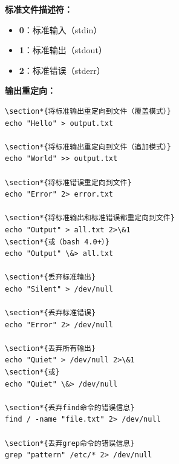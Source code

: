 \documentclass[12pt,UTF8]{ctexbook}
\begin{document}
\textbf{标准文件描述符：}
\begin{itemize}
    \item \textbf{0}：标准输入（stdin）
    \item \textbf{1}：标准输出（stdout）
    \item \textbf{2}：标准错误（stderr）
\end{itemize}

\textbf{输出重定向：}
\begin{verbatim}
\section*{将标准输出重定向到文件（覆盖模式）}
echo "Hello" > output.txt

\section*{将标准输出重定向到文件（追加模式）}
echo "World" >> output.txt

\section*{将标准错误重定向到文件}
echo "Error" 2> error.txt

\section*{将标准输出和标准错误都重定向到文件}
echo "Output" > all.txt 2>\&1
\section*{或（bash 4.0+）}
echo "Output" \&> all.txt

\section*{丢弃标准输出}
echo "Silent" > /dev/null

\section*{丢弃标准错误}
echo "Error" 2> /dev/null

\section*{丢弃所有输出}
echo "Quiet" > /dev/null 2>\&1
\section*{或}
echo "Quiet" \&> /dev/null

\section*{丢弃find命令的错误信息}
find / -name "file.txt" 2> /dev/null

\section*{丢弃grep命令的错误信息}
grep "pattern" /etc/* 2> /dev/null
\end{verbatim}
\end{document}
